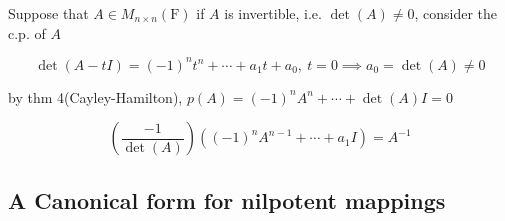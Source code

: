 \newpage

Suppose that $A \in M_{n \times n}(\mathrm F)$ if $A$ is invertible, i.e. $\det(A) \neq 0$, consider the c.p. of $A$

$$\det(A - tI) = (-1)^nt^n + \cdots + a_1t + a_0,~t=0 \implies a_0 = \det(A) \neq 0$$

by thm 4(Cayley-Hamilton), $p(A) = (-1)^nA^n + \cdots + \det(A)I = 0$

$$\left( \dfrac{-1}{\det(A)}\right)\left((-1)^nA^{n-1}+\cdots+a_1I\right) = A^{-1}$$

\subsection{A Canonical form for nilpotent mappings}
























